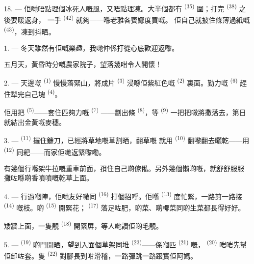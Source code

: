18. --- 佢哋唔點理個冰死人嘅風，又唔點理凍。大半個都冇
\textsuperscript{(35)} 圍；打完 \textsuperscript{(38)} 之後要暖返身，
一手 \textsuperscript{(42)} 就夠——喺老雅各賓娜度買嘅。
佢自己就披住條薄過紙嘅 \textsuperscript{(43)}，凍到抖晒。

\VUsaut{3.0mm}
\VUsaut{3.0mm}

\VUsaut{4.0mm}

1. --- 冬天雖然有佢嘅樂趣，我哋仲係打從心底歡迎返嚟。

五月天，黃昏時分嘅農家院子，望落幾咁令人開懷！

2. --- 天邊嘅 \textsuperscript{(1)} 慢慢落緊山，將成片
\textsuperscript{(3)} 浸喺佢紫紅色嘅 \textsuperscript{(2)} 裏面。勤力嘅
 \textsuperscript{(6)} 趕住犁完自己塊 \textsuperscript{(4)}。

佢用把 \textsuperscript{(5)}——套住匹夠力嘅 \textsuperscript{(7)}
——劃出條 \textsuperscript{(8)}，等 \textsuperscript{(9)}
一把把噉將撒落去，第日就結出金黃嘅麥穗。

3. ---  \textsuperscript{(11)} 攞住鐮刀，已經將草地嘅草割晒，翻草嘅
就用 \textsuperscript{(10)} 翻嚟翻去曬乾——用
\textsuperscript{(12)} 同耙——而家佢哋返緊嚟嘞。

有幾個行喺架牛拉嘅重車前面，孭住自己啲傢俬。另外幾個懶啲嘅，就舒舒服服
攤咗喺啲香噴噴嘅乾草上面。

4. --- 行過嗰陣，佢哋友好噉同 \textsuperscript{(16)} 打個招呼。佢喺
 \textsuperscript{(13)} 度忙緊，一路剪一路接
 \textsuperscript{(14)} 嘅枝。啲 \textsuperscript{(15)}
開緊花； \textsuperscript{(17)} 落足咗肥，啲菜、啲椰菜同啲生菜都長得好好。

矮牆上面，一隻靚 \textsuperscript{(18)} 開緊屏，等人哋讚佢啲毛靚。

\VUsaut{3.0mm}

5. ---  \textsuperscript{(19)} 啲門開晒，望到入面個草架同堆
 \textsuperscript{(23)}——係嗰匹 \textsuperscript{(21)} 嘅，
 \textsuperscript{(20)} 啱啱先幫佢卸咗套。隻
\textsuperscript{(22)} 對腳長到咁滑稽，一路彈跳一路跟實佢阿媽。

